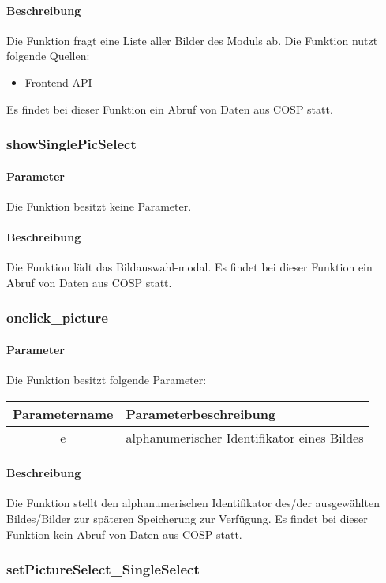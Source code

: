 \paragraph{Beschreibung} Die Funktion fragt eine Liste aller Bilder des Moduls ab. Die Funktion nutzt folgende Quellen:
\begin{itemize}
	\item Frontend-API
\end{itemize}
Es findet bei dieser Funktion ein Abruf von Daten aus {\glqq COSP\grqq} statt.
\subsubsection{showSinglePicSelect}
\paragraph{Parameter} Die Funktion besitzt keine Parameter.
\paragraph{Beschreibung} Die Funktion lädt das Bildauswahl-modal. Es findet bei dieser Funktion ein Abruf von Daten aus {\glqq COSP\grqq} statt.
\subsubsection{onclick\_picture}
\paragraph{Parameter} Die Funktion besitzt folgende Parameter:
\begin{table}[H]
	\begin{tabular}{|c|p{11cm}|}
		\hline
		\textbf{Parametername} & \textbf{Parameterbeschreibung} \\ \hline
		e & alphanumerischer Identifikator eines Bildes \\ \hline
	\end{tabular}
\end{table}
\paragraph{Beschreibung} Die Funktion stellt den alphanumerischen Identifikator des/der ausgewählten Bildes/Bilder zur späteren Speicherung zur Verfügung. Es findet bei dieser Funktion kein Abruf von Daten aus {\glqq COSP\grqq} statt.
\subsubsection{setPictureSelect\_SingleSelect}
